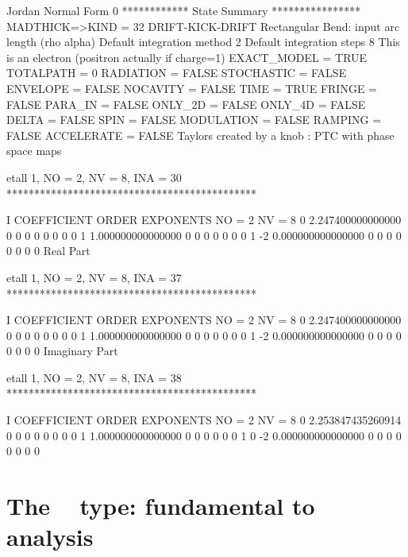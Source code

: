 \documentclass{hitec}     %
\begin{document}
{{{{{\begin{code}
  Jordan Normal Form            0
 ************ State Summary ****************
 MADTHICK=>KIND =   32  DRIFT-KICK-DRIFT
  Rectangular Bend: input arc length (rho alpha)
  Default integration method     2
  Default integration steps      8
 This is an electron (positron actually if charge=1)
       EXACT_MODEL =  TRUE
       TOTALPATH   =     0
       RADIATION   =  FALSE
       STOCHASTIC  =  FALSE
       ENVELOPE    =  FALSE
       NOCAVITY    =  FALSE
       TIME        =  TRUE
       FRINGE      =  FALSE
       PARA_IN     =  FALSE
       ONLY_2D     =  FALSE
       ONLY_4D     =  FALSE
       DELTA       =  FALSE
       SPIN        =  FALSE
       MODULATION  =  FALSE
       RAMPING     =  FALSE
       ACCELERATE  =  FALSE
 Taylors created by a knob : PTC with phase space maps

 etall    1, NO =    2, NV =    8, INA =   30
 *********************************************

    I  COEFFICIENT          ORDER   EXPONENTS
      NO =     2      NV =     8
   0   2.247400000000000       0  0  0  0  0  0  0  0
   1   1.000000000000000       0  0  0  0  0  0  0  1
    -2   0.000000000000000       0  0  0  0  0  0  0  0
  Real Part

 etall    1, NO =    2, NV =    8, INA =   37
 *********************************************

    I  COEFFICIENT          ORDER   EXPONENTS
      NO =     2      NV =     8
   0   2.247400000000000       0  0  0  0  0  0  0  0
   1   1.000000000000000       0  0  0  0  0  0  0  1
    -2   0.000000000000000       0  0  0  0  0  0  0  0
  Imaginary Part

 etall    1, NO =    2, NV =    8, INA =   38
 *********************************************

    I  COEFFICIENT          ORDER   EXPONENTS
      NO =     2      NV =     8
   0   2.253847435260914       0  0  0  0  0  0  0  0
   1   1.000000000000000       0  0  0  0  0  0  1  0
    -2   0.000000000000000       0  0  0  0  0  0  0  0
\end{code}

\section{The  ~ type: fundamental to analysis}
\label{s:cdamap}







}}}}}
\end{document}
